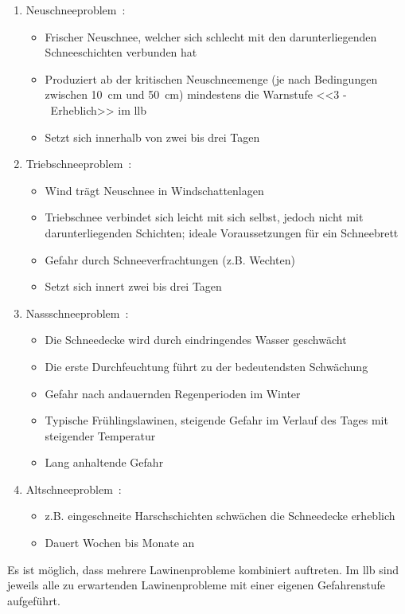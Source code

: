 \begin{enumerate}
  \item Neuschneeproblem~\cite{harveyrhynerschweizerlawinenkunde}\cite{achtunglawine}:
  \begin{itemize}
    \item Frischer Neuschnee, welcher sich schlecht mit den darunterliegenden Schneeschichten verbunden hat
    \item Produziert ab der kritischen Neuschneemenge (je nach Bedingungen zwischen \qty{10}{cm} und \qty{50}{cm}) mindestens die Warnstufe <<3 -~Erheblich>> im \acrfull{llb}
    \item Setzt sich innerhalb von zwei bis drei Tagen
  \end{itemize}
  \item Triebschneeproblem~\cite{harveyrhynerschweizerlawinenkunde}\cite{achtunglawine}:
  \begin{itemize}
    \item Wind trägt Neuschnee in Windschattenlagen
    \item Triebschnee verbindet sich leicht mit sich selbst, jedoch nicht mit darunterliegenden Schichten; ideale Voraussetzungen für ein Schneebrett
    \item Gefahr durch Schneeverfrachtungen (z.B. Wechten)
    \item Setzt sich innert zwei bis drei Tagen
  \end{itemize}
  \item Nassschneeproblem~\cite{harveyrhynerschweizerlawinenkunde}\cite{achtunglawine}:
  \begin{itemize}
    \item Die Schneedecke wird durch eindringendes Wasser geschwächt
    \item Die erste Durchfeuchtung führt zu der bedeutendsten Schwächung
    \item Gefahr nach andauernden Regenperioden im Winter
    \item Typische Frühlingslawinen, steigende Gefahr im Verlauf des Tages mit steigender Temperatur
    \item Lang anhaltende Gefahr
  \end{itemize}
  \item Altschneeproblem~\cite{harveyrhynerschweizerlawinenkunde}\cite{achtunglawine}:
  \begin{itemize}
    \item z.B. eingeschneite Harschschichten schwächen die Schneedecke erheblich
    \item Dauert Wochen bis Monate an
  \end{itemize}
\end{enumerate}
Es ist möglich, dass mehrere Lawinenprobleme kombiniert auftreten. Im \gls{llb} sind jeweils alle zu erwartenden Lawinenprobleme mit einer eigenen Gefahrenstufe aufgeführt.~\cite{slfTypischeLawinenprobleme}
\pagebreak
